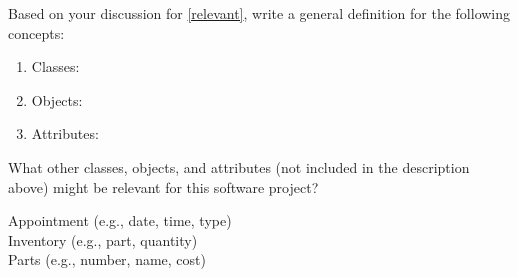 \Q \label{key1}
Based on your discussion for \ref{relevant}, write a general definition for the following concepts:

\begin{enumerate}[itemsep=0ex]

\item Classes: \hfill
{}

\item Objects: \hfill
{}

\item Attributes: \hfill
{}

\end{enumerate}


\Q What other classes, objects, and attributes (not included in the description above) might be relevant for this software project?

\begin{answer}
Appointment (e.g., date, time, type) \\
Inventory (e.g., part, quantity) \\
Parts (e.g., number, name, cost) \\
\end{answer}

